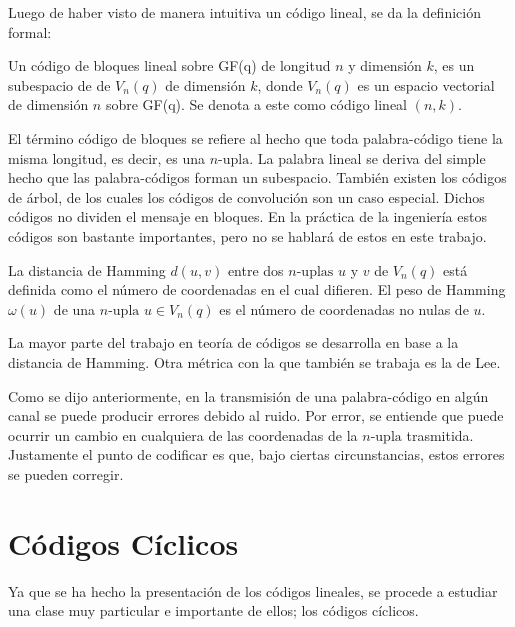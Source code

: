 Luego de haber visto de manera intuitiva un código lineal, se da la definición formal:
\begin{definicion}
Un código de bloques lineal sobre GF(q) de longitud $n$ y dimensión $k$, es un subespacio de de $V_n(q)$ de dimensión $k$, donde $V_n(q)$ es un espacio vectorial de dimensión $n$ sobre GF(q). Se denota a este como código lineal $(n,k)$.
\end{definicion}
El término código de bloques se refiere al hecho que toda palabra-código tiene la misma longitud, es decir, es una $n\mbox{-upla}$. La palabra lineal se deriva del simple hecho que las palabra-códigos forman un subespacio. 
También existen los códigos de árbol, de los cuales los códigos de convolución son un caso especial. Dichos códigos no dividen el mensaje en bloques. En la práctica de la ingeniería estos códigos son bastante importantes, pero no se hablará de estos en este trabajo.
\begin{definicion}
La distancia de Hamming $d(u,v)$ entre dos $n\mbox{-uplas}$ $u$ y $v$ de $V_n(q)$ está definida como el número de coordenadas en el cual difieren. El peso de Hamming $\omega(u)$ de una $n\mbox{-upla } u \in V_n(q)$ es el número de coordenadas no nulas de $u$.
\end{definicion}
La mayor parte del trabajo en teoría de códigos se desarrolla en base a la distancia de Hamming. Otra métrica con la que también se trabaja es la de Lee.

Como se dijo anteriormente, en la transmisión de una palabra-código en algún canal se puede producir errores debido al ruido. Por error, se entiende que puede ocurrir un cambio en cualquiera de las coordenadas de la $n\mbox{-upla}$ trasmitida. Justamente el punto de codificar es que, bajo ciertas circunstancias, estos errores se pueden corregir.

\section{\quad Códigos Cíclicos} 

Ya que se ha hecho la presentación de los códigos lineales, se procede a estudiar una clase muy particular e importante de ellos; los códigos cíclicos.


